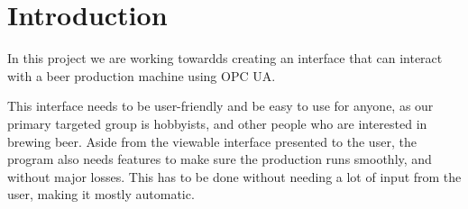 \section{Introduction}

In this project we are working towardds creating an interface that can interact with a beer production machine using OPC UA. \newline

This interface needs to be user-friendly and be easy to use for anyone, as our primary targeted group is hobbyists, and other people who are interested in brewing beer. \newline
Aside from the viewable interface presented to the user, the program also needs features to make sure the production runs smoothly, and without major losses. \newline
This has to be done without needing a lot of input from the user, making it mostly automatic. \newline
